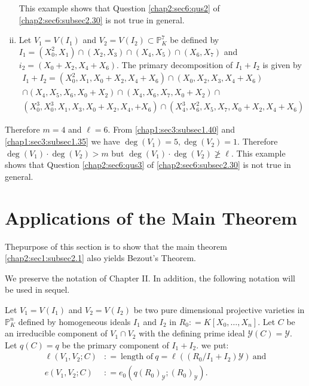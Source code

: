 \begin{examples}
\begin{enumerate}[(i)]
  This example shows that Question \ref{chap2:sec6:qus2} of
  \ref{chap2:sec6:subsec2.30} is not true in general. 
\item Let $V_{1} = V (I_{1})$ and $V_{2} = V(I_{2}) \subset
  \mathbb{P}^{7}_{K}$ be defined by $I_{1} = (X^{2}_{0}, X_{1}) \cap
  (X_{2}, X_{3}) \cap (X_{4}, X_{5}) \cap (X_{6}, X_{7})$ and $i_{2} =
  (X_{0} + X_{2}, X_{4} + X_{6})$. The primary decomposition of $I_{1}+
  I_{2}$ is given by  
{\fontsize{10pt}{12pt}\selectfont
  \begin{multline*}
    I_{1}+I_{2} = (X^{2}_{0}, X_{1}, X_{0} + X_{2}, X_{4} + X_{6})
    \cap (X_{0}, X_{2}, X_{3}, X_{4} + X_{6})\\ 
    \cap (X_{4}, X_{5}, X_{6}, X_{0} + X_{2})  
    \cap (X_{4}, X_{6}, X_{7}, X_{0} + X_{2}) \cap \\
    (X^{3}_{0}, X^{3}_{0}, X_{1}, X_{3}, X_{0}+ X_{2}, X_{4}, + X_{6})
    \cap (X^{3}_{4}, X^{2}_{6}, X_{5}, X_{7}, X_{0} +  X_{2}, X_{4} + X_{6})
  \end{multline*}}\relax
\end{enumerate}
\end{examples}

  Therefore $m = 4$ and $\ell = 6$. From \ref{chap1:sec3:subsec1.40}
  and \ref{chap1:sec3:subsec1.35} we have $\deg 
  (V_{1}) = 5, \deg (V_{2}) = 1$. Therefore $\deg (V_{1})\cdot \deg (V_{2})
  > m$ but \break $\deg (V_{1})\cdot \deg (V_{2}) \not \ge \ell$. This example
  shows that Question \ref{chap2:sec6:qus3} of
  \ref{chap2:sec6:subsec2.30} is not true in general.   

\section{Applications of the Main Theorem}\label{chap3:sec2}

The\pageoriginale purpose of this section is to show that the main
theorem \ref{chap2:sec1:subsec2.1} also yields Bezout's Theorem. 

We preserve the notation of Chapter II. In addition, the
  following notation will be used in sequel. 

\setcounter{notation}{14}
\begin{notation}\label{chap3:sec2:not3.15}
  Let $V_{1} = V(I_{1})$ and $V_{2} = V(I_{2})$ be two pure
  dimensional projective varieties in $\mathbb{P}^{n}_{K}$ defined by
  homogeneous ideals $I_{1}$ and $I_{2}$ in $R_{0}:  = K [X_{0},
    \ldots,  X_{n}]$. Let $C$ be an irreducible component of $V_{1}
  \cap V_{2}$ with the defining prime ideal $\mathscr{Y}(C) =
  \mathscr{Y}$. Let $q(C) = q$ be the primary component of $I_{1} +
  I_{2}$. we put:  
  \begin{align*}
    \ell (V_{1}, V_{2} ; C) &:  =  ~\text{length of}~ q = \ell
    ((R_{0}/ I_{1} + I_{2}) \mathscr{Y}) ~\text{and} \\ 
    e(V_{1}, V_{2}; C) &: = e_{0} (q(R_{0})_{\mathscr{Y}} ; (R_{0})_{\mathscr{Y}}).
  \end{align*}
\end{notation}

